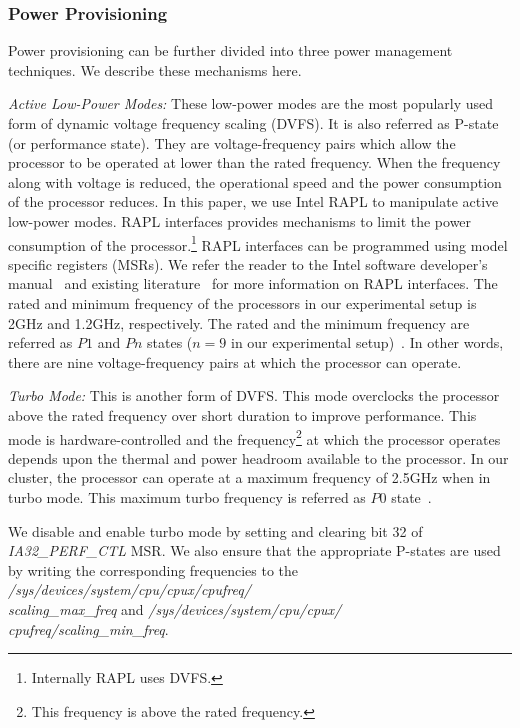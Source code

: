\documentclass{sig-alternate}
\begin{document}
\subsubsection{Power Provisioning}
\label{sec:bkgndpprov}
Power provisioning can be further divided into three power management 
techniques. We describe these mechanisms here. 

\emph{Active Low-Power Modes:} These low-power modes are the most popularly used 
form of dynamic voltage frequency scaling (DVFS). It is also referred as P-state 
(or performance state). They are voltage-frequency 
pairs which allow the processor to be operated at lower than the rated 
frequency. When the frequency along with voltage is reduced, the operational 
speed and the power consumption of the processor reduces. In this paper, 
we use Intel RAPL to manipulate active low-power modes. RAPL interfaces 
provides mechanisms to limit the power consumption of the processor.\footnote{Internally 
RAPL uses DVFS.} RAPL interfaces can be programmed using model specific registers 
(MSRs). We refer the reader to the Intel software developer's manual~\cite{intelsdm} 
and existing literature~\cite{barrypowerlimit, icpe_eprop} for more information on 
RAPL interfaces. The rated and minimum frequency of the processors in our experimental setup is 
2GHz and 1.2GHz, respectively. The rated and the minimum frequency are referred as 
$P1$ and $Pn$ states ($n=9$ in our experimental setup)~\cite{snbpower}. In other words, 
there are nine voltage-frequency pairs at which the processor can operate. 

\emph{Turbo Mode:} This is another form of DVFS. This mode overclocks the 
processor above the rated frequency over short duration to improve 
performance. This mode is hardware-controlled and the frequency\footnote{This frequency is above the 
rated frequency.} at which the processor operates depends upon the thermal and power headroom 
available to the processor. In our cluster, the processor can operate at a maximum frequency of 2.5GHz 
when in turbo mode. This maximum turbo frequency is referred as $P0$ state~\cite{snbpower}. 

We disable and enable turbo mode by setting and clearing bit 32 of \emph{IA32\_PERF\_CTL} MSR. 
We also ensure that the appropriate P-states are used by writing the corresponding 
frequencies to the \emph{/sys/devices/system/cpu/cpux/cpufreq/\\scaling\_max\_freq} 
and \emph{/sys/devices/system/cpu/cpux/\\cpufreq/scaling\_min\_freq}. 
\end{document}
